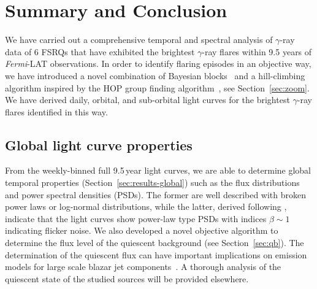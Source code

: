 \documentclass[twocolumn,linenumbers]{aastex62}
\newcommand{\gray}{$\gamma$-ray\xspace}
\newcommand{\fermiLAT}{\emph{Fermi}-LAT\xspace}
\begin{document}
\section{Summary and Conclusion}
\label{sec:conclusion}

We have carried out a comprehensive temporal and spectral analysis of  \gray data of 6 FSRQs that have exhibited the brightest \gray flares within 9.5 years of \fermiLAT observations.
In order to identify flaring episodes in an objective way, we have introduced a novel combination of Bayesian blocks~\citep[BBs,][]{2013ApJ...764..167S} and a hill-climbing algorithm inspired by the HOP group finding algorithm~\citep{1998ApJ...498..137E}, see Section~\ref{sec:zoom}.
We have derived daily, orbital, and sub-orbital light curves for the brightest \gray flares identified in this way.

\subsection{Global light curve properties}
From the weekly-binned full 9.5\,year light curves, we are able to determine global temporal properties (Section~\ref{sec:results-global}) such as the flux distributions and power spectral densities (PSDs). 
The former are well described with broken power laws or log-normal distributions, while the latter, derived following \citet{2014MNRAS.445..437M}, indicate that the light curves show power-law type PSDs with indices $\beta\sim 1$ indicating flicker noise.
We also developed a novel objective algorithm to determine the flux level of the quiescent background (see Section~\ref{sec:qb}).
The determination of the quiescent flux can have important implications on emission models for large scale blazar jet components~\citep{2014ApJ...780L..27M}.
A thorough analysis of the quiescent state of the studied sources will be provided elsewhere. 
\end{document}
